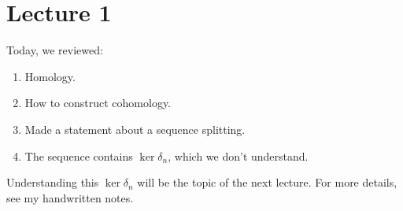 \documentclass{article}
\begin{document}
\section{Lecture 1}
\label{sec:lecture1}

Today, we reviewed:
\begin{enumerate}
\item Homology.
\item How to construct cohomology.
\item Made a statement about a sequence splitting.
\item The sequence contains $\ker \delta_n$, which we don't understand.
\end{enumerate}

Understanding this $\ker \delta_n$ will be the topic of the next lecture. For more details, see my handwritten notes.
\end{document}
